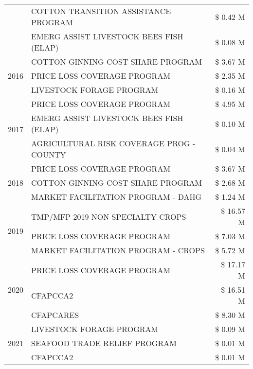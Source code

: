 \begin{tabular}{llr}
 & COTTON TRANSITION ASSISTANCE PROGRAM & \$ 0.42 M \\
 & EMERG ASSIST LIVESTOCK BEES FISH (ELAP) & \$ 0.08 M \\
\cline{1-3}
\multirow[t]{3}{*}{2016} & COTTON GINNING COST SHARE PROGRAM             & \$ 3.67 M \\
 & PRICE LOSS COVERAGE PROGRAM                   & \$ 2.35 M \\
 & LIVESTOCK FORAGE PROGRAM                      & \$ 0.16 M \\
\cline{1-3}
\multirow[t]{3}{*}{2017} & PRICE LOSS COVERAGE PROGRAM & \$ 4.95 M \\
 & EMERG ASSIST LIVESTOCK BEES FISH (ELAP) & \$ 0.10 M \\
 & AGRICULTURAL RISK COVERAGE PROG - COUNTY & \$ 0.04 M \\
\cline{1-3}
\multirow[t]{3}{*}{2018} & PRICE LOSS COVERAGE PROGRAM & \$ 3.67 M \\
 & COTTON GINNING COST SHARE PROGRAM & \$ 2.68 M \\
 & MARKET FACILITATION PROGRAM - DAHG & \$ 1.24 M \\
\cline{1-3}
\multirow[t]{3}{*}{2019} & TMP/MFP 2019 NON SPECIALTY CROPS & \$ 16.57 M \\
 & PRICE LOSS COVERAGE PROGRAM & \$ 7.03 M \\
 & MARKET FACILITATION PROGRAM - CROPS & \$ 5.72 M \\
\cline{1-3}
\multirow[t]{3}{*}{2020} & PRICE LOSS COVERAGE PROGRAM & \$ 17.17 M \\
 & CFAPCCA2 & \$ 16.51 M \\
 & CFAPCARES & \$ 8.30 M \\
\cline{1-3}
\multirow[t]{3}{*}{2021} & LIVESTOCK FORAGE PROGRAM & \$ 0.09 M \\
 & SEAFOOD TRADE RELIEF PROGRAM & \$ 0.01 M \\
 & CFAPCCA2 & \$ 0.01 M \\
\cline{1-3}
\bottomrule
\end{tabular}
